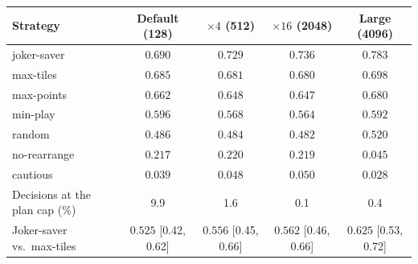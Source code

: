 \begin{tabular}{@{}lcccc@{}}\toprule
Strategy & Default (128) & $\times4$ (512) & $\times16$ (2048) & Large (4096)\\\midrule
joker-saver & $0.690$ & $0.729$ & $0.736$ & $0.783$ \\
max-tiles & $0.685$ & $0.681$ & $0.680$ & $0.698$ \\
max-points & $0.662$ & $0.648$ & $0.647$ & $0.680$ \\
min-play & $0.596$ & $0.568$ & $0.564$ & $0.592$ \\
random & $0.486$ & $0.484$ & $0.482$ & $0.520$ \\
no-rearrange & $0.217$ & $0.220$ & $0.219$ & $0.045$ \\
cautious & $0.039$ & $0.048$ & $0.050$ & $0.028$ \\
\midrule
Decisions at the plan cap (\%) & 9.9 & 1.6 & 0.1 & 0.4 \\
Joker-saver vs.\ max-tiles & $0.525$ [0.42, 0.62] & $0.556$ [0.45, 0.66] & $0.562$ [0.46, 0.66] & $0.625$ [0.53, 0.72] \\
\bottomrule\end{tabular}
